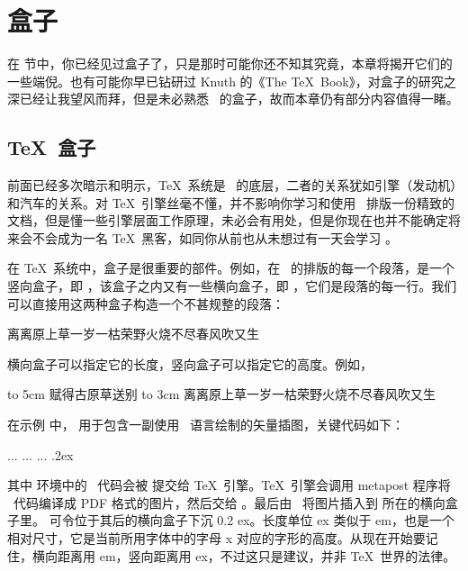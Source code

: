 \chapter{盒子}

在  节中，你已经见过盒子了，只是那时可能你还不知其究竟，本章将揭开它们的一些端倪。也有可能你早已钻研过 Knuth 的《The \TeX\ Book》，对盒子的研究之深已经让我望风而拜，但是未必熟悉 \ConTeXt\ 的盒子，故而本章仍有部分内容值得一睹。

\section{\TeX\ 盒子}

前面已经多次暗示和明示，\TeX\ 系统是 \ConTeXt\ 的底层，二者的关系犹如引擎（发动机）和汽车的关系。对 \TeX\ 引擎丝毫不懂，并不影响你学习和使用 \ConTeXt\ 排版一份精致的文档，但是懂一些引擎层面工作原理，未必会有用处，但是你现在也并不能确定将来会不会成为一名 \TeX\ 黑客，如同你从前也从未想过有一天会学习 \ConTeXt。

在 \TeX\ 系统中，盒子是很重要的部件。例如，在 \ConTeXt\ 的排版的每一个段落，是一个竖向盒子，即 \type{\vbox}，该盒子之内又有一些横向盒子，即 \type{\hbox}，它们是段落的每一行。我们可以直接用这两种盒子构造一个不甚规整的段落：

\startsample
\vbox{
  \hbox{离离原上草}\hbox{一岁一枯荣}\hbox{野火烧不尽}\hbox{春风吹又生}
}
\stopsample
{}

横向盒子可以指定它的长度，竖向盒子可以指定它的高度。例如，

\starttyping[option=TEX]
\hbox to 5cm {赋得古原草送别}
\vbox to 3cm {
  \hbox{离离原上草}\hbox{一岁一枯荣}\hbox{野火烧不尽}\hbox{春风吹又生}
}
\stoptyping

在示例 \in[rsquare] 中，\type{\hbox} 用于包含一副使用 \METAPOST\ 语言绘制的矢量插图，关键代码如下：

\starttyping[option=TEX]
... ... ...
\stopuseMPgraphic
\lower.2ex\hbox{}
\stoptyping

\noindent 其中  环境中的 \METAPOST\ 代码会被  提交给 \TeX\ 引擎。\TeX\ 引擎会调用 metapost 程序将 \METAPOST\ 代码编译成 PDF 格式的图片，然后交给 \ConTeXt。最后由 \ConTeXt\ 将图片插入到  所在的横向盒子里。\type{\lower .2ex} 可令位于其后的横向盒子下沉 0.2 ex。长度单位 ex 类似于 em，也是一个相对尺寸，它是当前所用字体中的字母 x 对应的字形的高度。从现在开始要记住，横向距离用 em，竖向距离用 ex，不过这只是建议，并非 \TeX\ 世界的法律。

